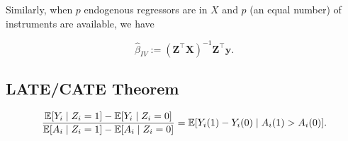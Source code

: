 %
%
%

Similarly, when \(p\) endogenous regressors are in \(X\) and \(p\) (an equal number) of instruments are available, we have

\begin{equation}\label{economet.inst.est}
\hat{\beta}_{IV} :=  \left( \boldsymbol{Z}^\top \boldsymbol{X} \right)^{-1} \boldsymbol{Z}^\top \boldsymbol{y}.
\end{equation}

\subsection{LATE/CATE Theorem}

\begin{theorem}

\[
\frac{\E[Y_i \mid Z_i = 1] - \E[Y_i \mid Z_i = 0]}{\E[A_i \mid Z_i = 1] - \E[A_i \mid Z_i = 0]} = \E[Y_i(1) - Y_i(0) \mid A_i(1) > A_i(0)].
\]

\end{theorem}

